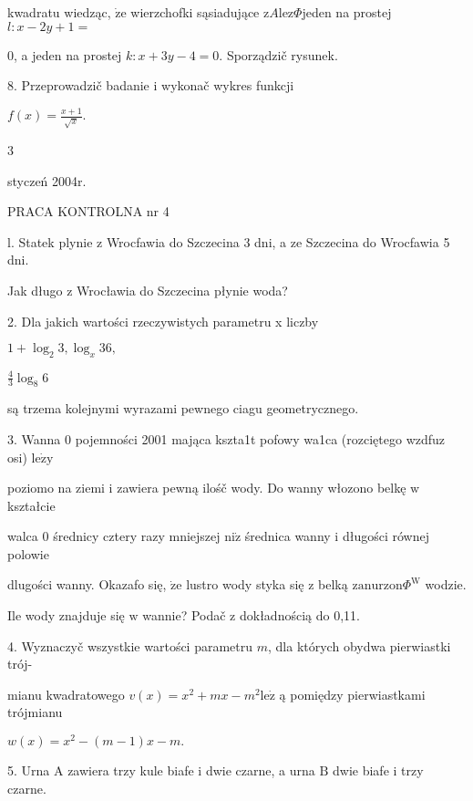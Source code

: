 \documentclass[a4paper,12pt]{article}
\begin{document}
kwadratu wiedząc, $\dot{\mathrm{z}}\mathrm{e}$ wierzchofki sąsiadujące $\mathrm{z}A\mathrm{l}\mathrm{e}\mathrm{z}\Phi$jeden na prostej $l:x-2y+1=$

$0$, a jeden na prostej $k:x+3y-4=0$. Sporządzič rysunek.

8. Przeprowadzič badanie $\mathrm{i}$ wykonač wykres funkcji

$f(x)=\displaystyle \frac{x+1}{\sqrt{x}}.$

3





styczeń 2004r.

PRACA KONTROLNA nr 4

l. Statek plynie z Wrocfawia do Szczecina 3 dni, a ze Szczecina do Wrocfawia 5 dni.

Jak długo z Wrocławia do Szczecina płynie woda?

2. Dla jakich wartości rzeczywistych parametru x liczby

$1+\log_{2}3, \log_{x}36,$

$\displaystyle \frac{4}{3}\log_{8}6$

są trzema kolejnymi wyrazami pewnego ciagu geometrycznego.

3. Wanna $0$ pojemności 2001 mająca kszta1t pofowy wa1ca (rozciętego wzdfuz osi) $\mathrm{l}\mathrm{e}\dot{\mathrm{z}}\mathrm{y}$

poziomo na ziemi $\mathrm{i}$ zawiera pewną ilośč wody. Do wanny włozono belkę $\mathrm{w}$ kształcie

walca $0$ średnicy cztery razy mniejszej $\mathrm{n}\mathrm{i}\dot{\mathrm{z}}$ średnica wanny $\mathrm{i}$ długości równej polowie

dlugości wanny. Okazafo się, $\dot{\mathrm{z}}\mathrm{e}$ lustro wody styka się $\mathrm{z}$ belką $\mathrm{z}\mathrm{a}\mathrm{n}\mathrm{u}\mathrm{r}\mathrm{z}\mathrm{o}\mathrm{n}\Phi^{\mathrm{W}}$ wodzie.

Ile wody znajduje się $\mathrm{w}$ wannie? Podač $\mathrm{z}$ dokładnością do 0,11.

4. Wyznaczyč wszystkie wartości parametru $m$, dla których obydwa pierwiastki trój-

mianu kwadratowego $v(x)=x^{2}+mx-m^{2}\mathrm{l}\mathrm{e}\dot{\mathrm{z}}$ ą pomiędzy pierwiastkami trójmianu

$w(x)=x^{2}-(m-1)x-m.$

5. Urna A zawiera trzy kule biafe $\mathrm{i}$ dwie czarne, a urna $\mathrm{B}$ dwie biafe $\mathrm{i}$ trzy czarne.
\end{document}
